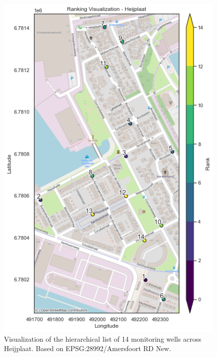 \begin{figure}[htbp]
    \centering
    \includegraphics[width=0.75\linewidth]{frontmatter/Heijplaat-fig/rankheij.png}
    \caption{Visualization of the hierarchical list of 14 monitoring wells across Heijplaat. Based on EPSG:28992/Amersfoort RD New.}
    \label{rankheij}
\end{figure}

\clearpage

